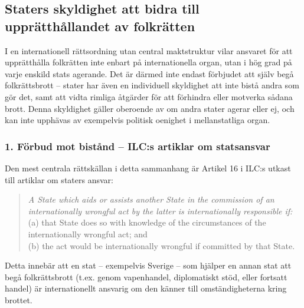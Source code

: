%

\subsection{Staters skyldighet att bidra till upprätthållandet av folkrätten}

I en internationell rättsordning utan central maktstruktur vilar ansvaret för
att upprätthålla folkrätten inte enbart på internationella organ, utan i hög grad på varje enskild stats agerande.
Det är därmed inte endast förbjudet att själv begå folkrättsbrott – stater har även en individuell skyldighet 
att inte bistå andra som gör det, samt att vidta rimliga åtgärder för att förhindra eller motverka sådana brott. 
Denna skyldighet gäller oberoende av om andra stater agerar eller ej, och kan inte upphävas av exempelvis politisk oenighet i mellanstatliga organ.


\subsubsection*{1. Förbud mot bistånd – ILC:s artiklar om statsansvar}

Den mest centrala rättskällan i detta sammanhang är Artikel 16 i ILC:s utkast till artiklar om staters ansvar:

\begin{quote}
\textit{A State which aids or assists another State in the commission of an internationally wrongful act by the latter is internationally responsible if:}\\
(a) that State does so with knowledge of the circumstances of the internationally wrongful act; and\\
(b) the act would be internationally wrongful if committed by that State.
\end{quote}

Detta innebär att en stat – exempelvis Sverige – som hjälper en annan stat att begå folkrättsbrott 
(t.ex. genom vapenhandel, diplomatiskt stöd, eller fortsatt handel) är internationellt 
ansvarig om den känner till omständigheterna kring brottet.

